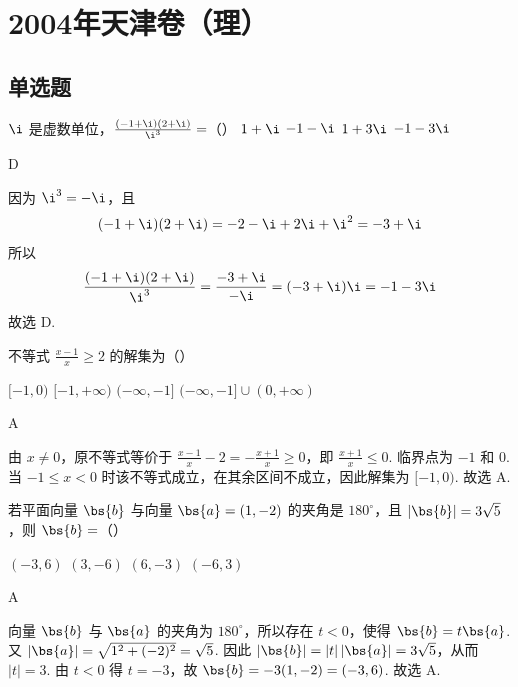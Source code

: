 \chapter{2004年天津卷（理）}
\section{单选题}
\begin{problem}
\(\i\) 是虚数单位，\(\frac{(-1 + \i)(2 + \i)}{\i^3} =\)（\quad）
\choices
    {\(1 + \i\)}
    {\(-1 - \i\)}
    {\(1 + 3\i\)}
    {\(-1 - 3\i\)}
\end{problem}

\begin{answer}
D
\end{answer}

\begin{solution}
因为 \(\i^3=-\i\)，且
\[
(-1+\i)(2+\i)=-2-\i+2\i+\i^2=-3+\i
\]
所以
\[
\frac{(-1+\i)(2+\i)}{\i^3}=\frac{-3+\i}{-\i}=(-3+\i)\i=-1-3\i
\]
故选 D.
\end{solution}

\begin{problem}
不等式 \(\frac{x - 1}{x} \geqslant 2\) 的解集为（\quad）

\choices
    {\([-1,0)\)}
    {\([-1, +\infty)\)}
    {\((-\infty, -1]\)}
    {\((-\infty, -1] \cup (0, +\infty)\)}
\end{problem}

\begin{answer}
A
\end{answer}

\begin{solution}
由 \(x\ne0\)，原不等式等价于 \(\frac{x-1}{x}-2=-\frac{x+1}{x}\geqslant0\)，即 \(\frac{x+1}{x}\leqslant0\). 临界点为 \(-1\) 和 \(0\). 当 \(-1\leqslant x<0\) 时该不等式成立，在其余区间不成立，因此解集为 \([-1,0)\).
故选 A.
\end{solution}

\begin{problem}
若平面向量 \(\bs{b}\) 与向量 \(\bs{a} = (1, -2)\) 的夹角是 \(180^{\circ}\)，且 \(\left|\bs{b}\right| = 3\sqrt{5}\)，则 \(\bs{b} =\)（\quad）

\choices
    {\((-3,6)\)}
    {\((3, -6)\)}
    {\((6, -3)\)}
    {\((-6,3)\)}
\end{problem}

\begin{answer}
A
\end{answer}

\begin{solution}
向量 \(\bs{b}\) 与 \(\bs{a}\) 的夹角为 \(180^{\circ}\)，所以存在 \(t<0\)，使得 \(\bs{b}=t\bs{a}\). 又
\(|\bs{a}|=\sqrt{1^2+(-2)^2}=\sqrt5\). 因此 \(|\bs{b}|=|t|\,|\bs{a}|=3\sqrt5\)，从而 \(|t|=3\). 由 \(t<0\) 得 \(t=-3\)，故 \(\bs{b}=-3(1,-2)=(-3,6)\).
故选 A.
\end{solution}

